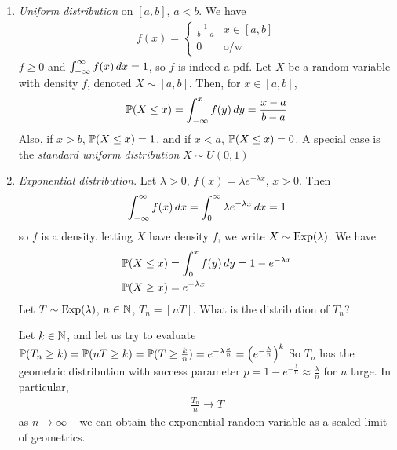 \documentclass{../template/note}
\begin{document}
    \begin{enumerate}[label=\protect\circled{\arabic*}]
        \item \emph{Uniform distribution} on \([a, b]\), \(a < b\). We have
        \begin{align*}
            f(x) = \begin{cases}
                \frac 1{b-a} & x \in [a, b] \\
                0 & \text{o/w}
            \end{cases}
        \end{align*}
        \(f \geq 0\) and \(\int_{-\infty}^\infty f(x) \,d{x} = 1\), so \(f\) is indeed a pdf. Let \(X\) be a random variable with density \(f\), denoted \(X \sim [a, b]\). Then, for \(x \in [a, b]\),
        \begin{align*}
            \mathbb P(X \leq x) = \int_{-\infty}^x f(y) \,d{y} = \frac{x-a}{b-a}
        \end{align*}
        Also, if \(x>b\), \(\mathbb P(X \leq x) = 1\), and if \(x < a\), \(\mathbb P(X \leq x) = 0\). A special case is the \emph{standard uniform distribution} \(X \sim U(0, 1)\)
        \item \emph{Exponential distribution}. Let \(\lambda > 0\), \(f(x) = \lambda e^{-\lambda x}\), \(x > 0\). Then
        \begin{align*}
            \int_{-\infty}^\infty f(x) \,d{x} = \int_0^\infty \lambda e^{-\lambda x} \,d{x} = 1
        \end{align*}
        so \(f\) is a density. letting \(X\) have density \(f\), we write \(X \sim \operatorname{Exp}(\lambda)\). We have
        \begin{align*}
            \mathbb P(X \leq x) &= \int_0^x f(y) \,d{y} = 1 - e^{-\lambda x} \\
            \mathbb P(X \geq x) &= e^{-\lambda x}
        \end{align*}
        Let \(T \sim \operatorname{Exp}(\lambda)\), \(n \in \mathbb N\), \(T_n = \left\lfloor nT \right\rfloor\). What is the distribution of \(T_n\)?

        Let \(k \in \mathbb N\), and let us try to evaluate \(\mathbb P(T_n \geq k) = \mathbb P(nT \geq k) = \mathbb P(T \geq \frac k n) = e^{-\lambda \frac k n} = \left(e^{-\frac{\lambda}n}\right)^k\)
        So \(T_n\) has the geometric distribution with success parameter \(p = 1 - e^{-\frac{\lambda}n} \approx \frac{\lambda} n\) for \(n\) large. In particular,
        \begin{align*}
            \frac{T_n} n \to T
        \end{align*}
        as \(n \to \infty\) -- we can obtain the exponential random variable as a scaled limit of geometrics.
        

\end{enumerate}
\end{document}
